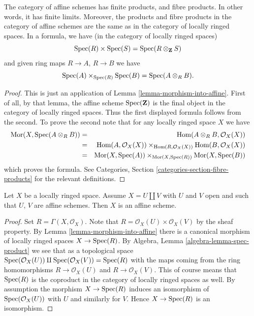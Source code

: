 \begin{lemma}
\label{lemma-fibre-product-affine-schemes}
The category of affine schemes has finite products, and fibre products.
In other words, it has finite limits. Moreover, the products
and fibre products in the category of affine schemes
are the same as in the category of locally ringed spaces.
In a formula, we have (in the category of locally ringed spaces)
$$
\mathop{\mathrm{Spec}}(R) \times \mathop{\mathrm{Spec}}(S) =
\mathop{\mathrm{Spec}}(R \otimes_{\mathbf{Z}} S)
$$
and given ring maps $R \to A$, $R \to B$ we have
$$
\mathop{\mathrm{Spec}}(A) \times_{\mathop{\mathrm{Spec}}(R)} \mathop{\mathrm{Spec}}(B)
=
\mathop{\mathrm{Spec}}(A \otimes_R B).
$$
\end{lemma}

\begin{proof}
This is just an application of Lemma \ref{lemma-morphism-into-affine}.
First of all, by that lemma, the affine scheme
$\mathop{\mathrm{Spec}}(\mathbf{Z})$ is the final object in the category
of locally ringed spaces. Thus the first displayed formula
follows from the second. To prove the second note that
for any locally ringed space $X$ we have
\begin{eqnarray*}
\mathop{\mathrm{Mor}}\nolimits(X, \mathop{\mathrm{Spec}}(A \otimes_R B))
& = &
\mathop{\mathrm{Hom}}\nolimits(A \otimes_R B, \mathcal{O}_X(X)) \\
& = &
\mathop{\mathrm{Hom}}\nolimits(A, \mathcal{O}_X(X))
\times_{\mathop{\mathrm{Hom}}\nolimits(R, \mathcal{O}_X(X))}
\mathop{\mathrm{Hom}}\nolimits(B, \mathcal{O}_X(X)) \\
& = &
\mathop{\mathrm{Mor}}\nolimits(X, \mathop{\mathrm{Spec}}(A))
\times_{\mathop{\mathrm{Mor}}\nolimits(X, \mathop{\mathrm{Spec}}(R))}
\mathop{\mathrm{Mor}}\nolimits(X, \mathop{\mathrm{Spec}}(B))
\end{eqnarray*}
which proves the formula.
See Categories, Section \ref{categories-section-fibre-products} for the
relevant definitions.
\end{proof}

\begin{lemma}
\label{lemma-disjoint-union-affines}
Let $X$ be a locally ringed space.
Assume $X = U \amalg V$ with $U$ and $V$ open and
such that $U$, $V$ are affine schemes. Then $X$ is an affine scheme.
\end{lemma}

\begin{proof}
Set $R = \Gamma(X, \mathcal{O}_X)$.
Note that $R = \mathcal{O}_X(U) \times \mathcal{O}_X(V)$
by the sheaf property. By Lemma \ref{lemma-morphism-into-affine}
there is a canonical morphism of locally ringed spaces
$X \to \mathop{\mathrm{Spec}}(R)$. By Algebra, Lemma \ref{algebra-lemma-spec-product}
we see that as a topological space
$\mathop{\mathrm{Spec}}(\mathcal{O}_X(U)) \amalg \mathop{\mathrm{Spec}}(\mathcal{O}_X(V)) =
\mathop{\mathrm{Spec}}(R)$
with the maps coming from the ring homomorphisms
$R \to \mathcal{O}_X(U)$ and $R \to \mathcal{O}_X(V)$.
This of course means that $\mathop{\mathrm{Spec}}(R)$ is the coproduct
in the category of locally ringed spaces as well.
By assumption the morphism $X \to \mathop{\mathrm{Spec}}(R)$ induces an isomorphism
of $\mathop{\mathrm{Spec}}(\mathcal{O}_X(U))$ with $U$ and similarly
for $V$. Hence $X \to \mathop{\mathrm{Spec}}(R)$ is an isomorphism.
\end{proof}















